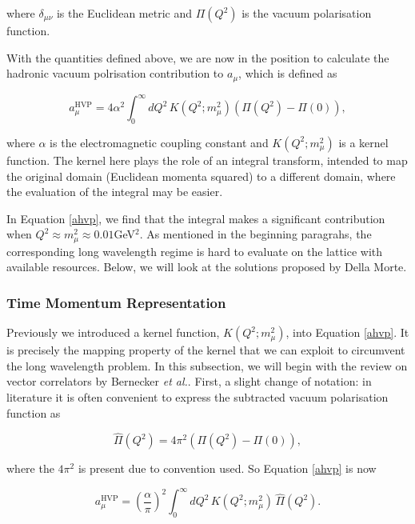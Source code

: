 \documentclass{article}
\numberwithin{equation}{section} %
\begin{document}
\noindent where $\delta_{\mu\nu}$ is the Euclidean metric and $\Pi(Q^2)$ is the vacuum polarisation function.

With the quantities defined above, we are now in the position to calculate the hadronic vacuum polrisation contribution to $a_\mu$, which is defined as 

\begin{equation}
a_\mu^\mathrm{HVP} = 4\alpha^2 \int_0^\infty dQ^2 \, K(Q^2;m_\mu^2) \left(\Pi(Q^2) - \Pi(0) \right),
\label{ahvp}
\end{equation}

\noindent where $\alpha$ is the electromagnetic coupling constant and $K(Q^2;m_\mu^2)$ is a kernel function. The kernel here plays the role of an integral transform, intended to map the original domain (Euclidean momenta squared) to a different domain, where the evaluation of the integral may be easier. 

In Equation \ref{ahvp}, we find that the integral makes a significant contribution when $Q^2\approx m_\mu^2\approx 0.01$GeV$^2$. As mentioned in the beginning paragrahs, the corresponding long wavelength regime is hard to evaluate on the lattice with available resources. Below, we will look at the solutions proposed by Della Morte\cite{dellamorte}.

\subsubsection{Time Momentum Representation}\label{tmr}

Previously we introduced a kernel function, $K(Q^2;m_\mu^2)$, into Equation \ref{ahvp}. It is precisely the mapping property of the kernel that we can exploit to circumvent the long wavelength problem. In this subsection, we will begin with the review on vector correlators by Bernecker \textit{et al.}\cite{vector}. First, a slight change of notation: in literature it is often convenient to express the subtracted vacuum polarisation function as

\begin{equation}
\hat{\Pi}(Q^2) = 4\pi^2(\Pi(Q^2) - \Pi(0)),
\end{equation}

\noindent where the $4\pi^2$ is present due to convention used. So Equation \ref{ahvp} is now 

\begin{equation}
a_\mu^\mathrm{HVP} = \left(\frac{\alpha}{\pi}\right)^2 \int_0^\infty dQ^2 \, K(Q^2;m_\mu^2) \,\hat{\Pi}(Q^2).
\end{equation}
\end{document}
